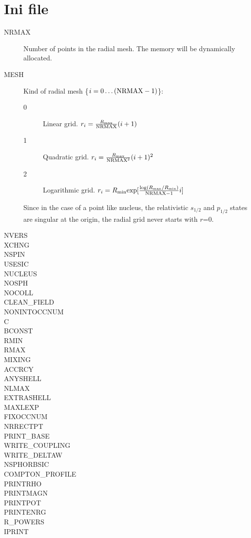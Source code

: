 \section{Ini file}
\begin{description}

\item[NRMAX] 
	Number of points in the radial mesh. The memory will be
	dynamically allocated. 
\item[MESH]
	Kind of radial mesh \{$i=0\ldots(\mathrm{NRMAX-1})$\}:
	\begin{description}
	\item[0]
		Linear grid.
		\( r_i=\frac{R_{\mathrm{max}}}{\mathrm{NRMAX}} (i+1) \)
	\item[1]
		Quadratic grid.
		\( r_i=\frac{R_{\mathrm{max}}}{\mathrm{NRMAX}^2} (i+1)^2 \)
	\item[2]
		Logarithmic grid.
		\( r_i=R_{\mathrm{min}}\mathrm{exp}
		[\frac{\log(R_{\mathrm{max}}/R_{\mathrm{min}})}{\mathrm{NRMAX}-1}
		i ]\)
	\end{description}
	Since in the case of a point like nucleus, the relativistic
	$s_{1/2}$ and $p_{1/2}$ states are singular at the origin, the
	radial grid never starts with $r$=0.
\item[NVERS]
\item[XCHNG]
\item[NSPIN]
\item[USESIC]
\item[NUCLEUS]
\item[NOSPH]
\item[NOCOLL]
\item[CLEAN\_FIELD]
\item[NONINTOCCNUM]

\item[C]
\item[BCONST]
\item[RMIN]
\item[RMAX]
\item[MIXING]
\item[ACCRCY]
\item[ANYSHELL]

\item[NLMAX]
\item[EXTRASHELL]
\item[MAXLEXP]
\item[FIXOCCNUM]
\item[NRRECTPT]

\item[PRINT\_BASE]
\item[WRITE\_COUPLING]
\item[WRITE\_DELTAW]
\item[NSPHORBSIC]
\item[COMPTON\_PROFILE]
\item[PRINTRHO]
\item[PRINTMAGN]
\item[PRINTPOT]
\item[PRINTENRG]
\item[R\_POWERS]
\item[IPRINT]

\end{description}

